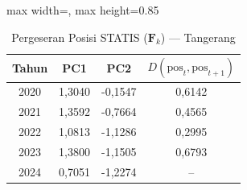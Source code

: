 \begin{table}[H]
\centering
\caption{Pergeseran Posisi STATIS ($\mathbf{F}_k$) --- Tangerang} \label{tab:app2jarak_statis_skor_tangerang}
\begin{adjustbox}{max width=\textwidth, max height=0.85\textheight}
\begin{tabular}{|c|c|c|c|}
\hline
\textbf{Tahun} & \textbf{PC1} & \textbf{PC2} & \textbf{$D(\text{pos}_t, \text{pos}_{t+1})$} \\
\hline
2020 & 1,3040 & -0,1547 & 0,6142 \\
2021 & 1,3592 & -0,7664 & 0,4565 \\
2022 & 1,0813 & -1,1286 & 0,2995 \\
2023 & 1,3800 & -1,1505 & 0,6793 \\
2024 & 0,7051 & -1,2274 & -- \\
\hline
\end{tabular}
\end{adjustbox}
\end{table}